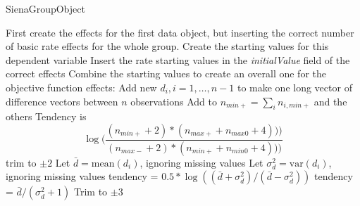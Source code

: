 \documentclass[12pt,a4paper]{article}
\makeatletter
\renewcommand{\=}{\,=\,}
\newcommand{\+}{\,+\,}
\newcommand{\nnm}[1]{\textsf{\textit{#1}}}
\renewcommand{\subsection}{\@startsection{subsection}{2}
                {0pt}{0.7\baselineskip}{0.3\baselineskip}
                {\sffamily} }
\makeatother
\begin{document}
 \subsection{SienaGroupObject}
 \begin{algorithmic}
 \STATE First create the effects for the first data object, but inserting the
 correct number of basic rate effects for the whole group.
 \STATE Create the starting values for this dependent variable
 \STATE Insert the rate starting values in the \nnm{initialValue} field of the
 correct effects
 \STATE Combine the starting values to create an overall one for the objective
 function effects:
 \STATE Add new $d_i, i=1,\ldots,n-1$ to make one long vector of
 difference vectors between $n$ observations
 \STATE Add to $n_{min+} = \sum_i n_{i,min+}$ and the others
 \STATE Tendency is
 $$  \log(\frac{(n_{min+} + 2 ) * (n_{max+} + n_{max0} + 4)))}
 {(n_{max-} + 2 ) * (n_{min+} + n_{min0} + 4)))}
 $$
 \STATE trim to $\pm 2$
 \ENDIF
 \STATE Let $\bar{d} = \mathrm{mean}(d_i)$, ignoring missing values
 \STATE Let $\sigma_d^2 = \mathrm{var} (d_i)$, ignoring missing values
 \STATE tendency = $0.5 * \log((\bar{d} + \sigma_d^2)/(\bar{d} - \sigma_d^2))$
 \ELSE
 \STATE tendency = $\bar{d} /(\sigma_d^2+ 1)$
 \ENDIF
 \STATE Trim to $\pm 3$
 \ENDIF
 \ENDIF
{}
\STATE
\ELSE[bipartite]
\STATE
\ENDIF
 \ENDFOR
 \ENDFOR
\end{algorithmic}
\end{document}
